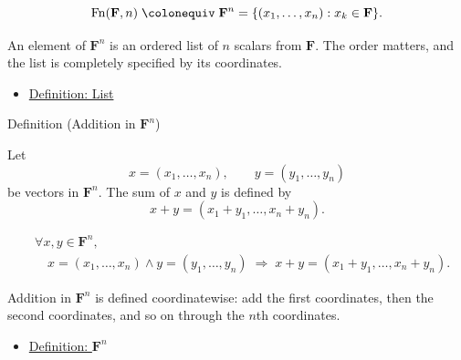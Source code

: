 \begin{remark*}
\[
\operatorname{Fn}(\mathbf{F},n)
\;\colonequiv\;
\mathbf{F}^n = \{(x_1,\ldots,x_n) : x_k \in \mathbf{F}\}.
\]
\end{remark*}

\begin{remark*}[Interpretation]
An element of $\mathbf{F}^n$ is an ordered list of $n$ scalars from $\mathbf{F}$.
The order matters, and the list is completely specified by its coordinates.
\end{remark*}

\begin{dependencies}
\begin{itemize} 
  \item \hyperref[def:list]{Definition: List}
\end{itemize}
\end{dependencies}


\begin{definitionbox}{Definition (Addition in $\mathbf{F}^n$)}
\begin{definition}
\label{def:addition-in-fn}
Let
\[
x=(x_1,\dots,x_n), \qquad y=(y_1,\dots,y_n)
\]
be vectors in $\mathbf{F}^n$.
The sum of $x$ and $y$ is defined by
\[
x+y
=
(x_1+y_1,\dots,x_n+y_n).
\]
\end{definition}
\end{definitionbox}

\begin{remark*}
\[
\begin{aligned}
&\forall x,y \in \mathbf{F}^n, \\
&\quad
x=(x_1,\dots,x_n)\land y=(y_1,\dots,y_n)
\;\Rightarrow\;
x+y=(x_1+y_1,\dots,x_n+y_n).
\end{aligned}
\]
\end{remark*}

\begin{remark*}[Interpretation]
Addition in $\mathbf{F}^n$ is defined coordinatewise: add the first coordinates,
then the second coordinates, and so on through the $n$th coordinates.
\end{remark*}

\begin{dependencies}
\begin{itemize}
  \item \hyperref[def:fn]{Definition: $\mathbf{F}^n$}
\end{itemize}
\end{dependencies}

